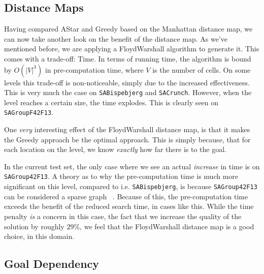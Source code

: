 \documentclass[letterpaper]{article}
\begin{document}
	\subsection{Distance Maps}
		Having compared AStar and Greedy based on the Manhattan distance map, we can now take another look on the benefit of the distance map. As we've mentioned before, we are applying a FloydWarshall algorithm to generate it. This comes with a trade-off: Time. In terms of running time, the algorithm is bound by $O(|V|^3)$ in pre-computation time, where $V$ is the number of cells. On some levels this trade-off is non-noticeable, simply due to the increased effectiveness. This is very much the case on \verb=SABispebjerg= and \verb=SACrunch=. However, when the level reaches a certain size, the time explodes. This is clearly seen on \verb=SAGroupF42F13=.

		One \emph{very} interesting effect of the FloydWarshall distance map, is that it makes the Greedy approach be the optimal approach. This is simply because, that for each location on the level, we know \emph{exactly} how far there is to the goal.

		In the current test set, the only case where we see an actual \emph{increase} in time is on \verb=SAGroup42F13=. A theory as to why the pre-computation time is much more significant on this level, compared to i.e. \verb=SABispebjerg=, is because \verb=SAGroup42F13= can be considered a sparse graph ~\cite{sparse}. Because of this, the pre-computation time exceeds the benefit of the reduced search time, in cases like this. While the time penalty \emph{is} a concern in this case, the fact that we increase the quality of the solution by roughly $29\%$, we feel that the FloydWarshall distance map is a good choice, in this domain.

	\subsection{Goal Dependency}
\end{document}

